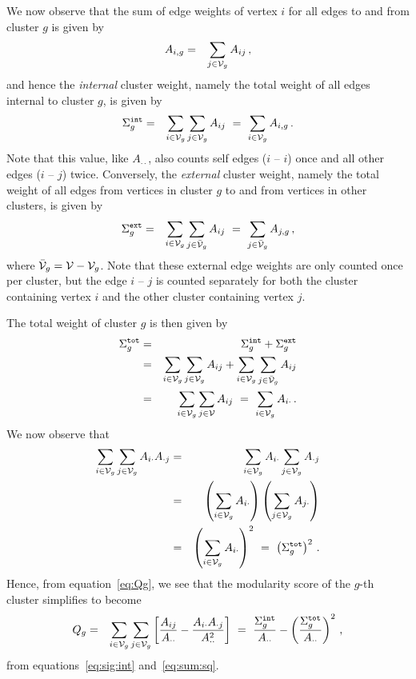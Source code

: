 \documentclass[a4paper]{article}
\begin{document}
We now observe that the sum of edge weights of vertex $i$ for all edges to and from cluster $g$
is given by
\begin{eqnarray}
  A_{i,g} & = & \sum_{j\in{\cal V}_g} A_{ij}\,,
\end{eqnarray}
and hence the {\em internal} cluster weight, namely the total weight of all edges internal to 
cluster $g$, is given by
\begin{eqnarray}
   \Sigma_g^{\tt int} & = & \sum_{i\in{\cal V}_g}\sum_{j\in{\cal V}_g} A_{ij}
   ~=~\sum_{i\in{\cal V}_g} A_{i,g}\,.
\label{eq:sig:int}
\end{eqnarray}
Note that this value, like $A_{\cdot\cdot}$, also counts self edges ($i$ -- $i$) once and all other edges 
($i$ -- $j$) twice.
Conversely, the {\em external} cluster weight, namely the total weight of all edges from vertices
in cluster $g$ to and from vertices in other clusters, is given by
\begin{eqnarray}
   \Sigma_g^{\tt ext} & = & \sum_{i\in{\cal V}_g}\sum_{j\in\bar{\cal V}_g}
   A_{ij} ~=~\sum_{j\in\bar{\cal V}_g} A_{j,g}\,,
\end{eqnarray}
where $\bar{\cal V}_g={\cal V}-{\cal V}_g$.
Note that these external edge weights are only counted once per cluster, but the
edge $i$ -- $j$ is counted separately for both the cluster containing vertex $i$
and the other cluster containing vertex $j$.

The total weight of cluster $g$ is then given by
\begin{eqnarray}
   \Sigma_g^{\tt tot} & = & \Sigma_g^{\tt int} + \Sigma_g^{\tt ext}
\nonumber\\&=&
   \sum_{i\in{\cal V}_g}\sum_{j\in{\cal V}_g} A_{ij} 
   + \sum_{i\in{\cal V}_g}\sum_{j\in\bar{\cal V}_g} A_{ij}
\nonumber\\&=&
   \sum_{i\in{\cal V}_g}\sum_{j\in{\cal V}} A_{ij}~=~\sum_{i\in{\cal V}_g}A_{i\cdot}\,.
\label{eq:sig:tot}
\end{eqnarray}
We now observe that
\begin{eqnarray}
    \sum_{i\in{\cal V}_g}\sum_{j\in{\cal V}_g} A_{i\cdot}A_{\cdot j}
    & = & \sum_{i\in{\cal V}_g}A_{i\cdot}\sum_{j\in{\cal V}_g} A_{\cdot j}
\nonumber\\&=&
    \left(\sum_{i\in{\cal V}_g}A_{i\cdot}\right)\left(\sum_{j\in{\cal V}_g} A_{j\cdot}\right)
\nonumber\\&=&
    \left(\sum_{i\in{\cal V}_g}A_{i\cdot}\right)^2 ~=~ \left(\Sigma_g^{\tt tot}\right)^2\,.
\label{eq:sum:sq}
\end{eqnarray}
Hence, from equation~\eqref{eq:Qg}, we see that the modularity score of the $g$-th cluster
simplifies to become
\begin{eqnarray}
   Q_g & = & \sum_{i\in{\cal V}_g}\sum_{j\in{\cal V}_g} \left[
  \frac{A_{ij}}{A_{\cdot\cdot}}-
  \frac{A_{i\cdot}A_{\cdot j}}{A_{\cdot\cdot}^2}
  \right]
~=~    \frac{\Sigma_g^{\tt int}}{A_{\cdot\cdot}}
    -\left(\frac{\Sigma_g^{\tt tot}}{A_{\cdot\cdot}}\right)^2\,,
\label{eq:Qg:only}
\end{eqnarray}
from equations~\eqref{eq:sig:int} and~\eqref{eq:sum:sq}.
\end{document}
